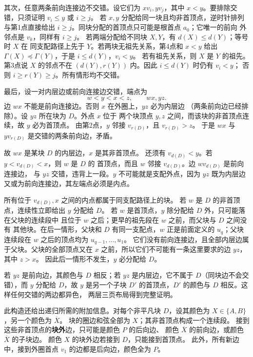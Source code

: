 \begin{solution}
其次，任意两条前向连接边不交错。设它们为 $xv_i,yv_j$，其中
$x<y$。要排除交错，只须证明 $v_i\leq y$ 或 $i\geq j$。
若 $x,y$ 分配给同一块且均非首顶点，逆时针排列与第1点直接给出
$i\geq j$。同块分配的首顶点只可能是根首点 $a_0$；它唯一的前向
外邻点是 $v_k$，同样有 $i\geq j$。
若两端分配给不同块 $X,Y$，有 $d(X)\leq d(Y)$；等号时 $X$ 在
同支配路径上先于 $Y$。若两块无祖先关系，第4点和 $x<y$ 给出
$\Gamma(X)\preceq\Gamma(Y)$，于是 $i\leq d(Y)$，$v_i<y$。
若有祖先关系，则 $X$ 是 $Y$ 的祖先。第3点说 $X$ 的邻点不在
$(d(Y),r(Y))$ 内。因此 $i\leq d(Y)$ 时仍有 $v_i<y$；
否则 $i\geq r(Y)\geq j$。所有情形均不交错。

最后，设一对内层边或前向连接边交错，端点为
\[
 w<y<x<z,\qquad wx, yz.
\]
边 $wx$ 不能是前向连接边。否则 $x$ 在外圈上，$yz$ 必为内层边
（两条前向边已经排除）。设 $yz$ 所在块为 $D$。外点 $x$ 位于
两个块顶点 $y,z$ 之间，而该块的非首顶点连续，故 $y$ 必为首顶点。
由第2点，$y$ 邻接 $v_{r(D)}$，且 $v_{r(D)}>z$。
于是 $wx$ 与 $yv_{r(D)}$ 是交错的两条前向边，矛盾。

故 $wx$ 是某块 $D$ 的内层边，$x$ 是其非首顶点。
还须有 $v_{d(D)}<y$。若 $y<v_{d(D)}<x$，则 $w$ 是 $D$ 的
首顶点，而且 $w$ 邻接 $v_{d(D)}$。边 $wv_{d(D)}$ 是前向连接边，
与 $yz$ 交错，违背上一段。$y$ 不可能就是支配外点，因为 $yz$
既为内层边又或为前向连接边，其左端点必须是内点。

所有位于 $v_{d(D)},x$ 之间的内点都属于同支配路径上的块。
若 $w$ 是 $D$ 的非首顶点，连续性立即给出 $y$ 分配给 $D$。
若 $w$ 是首顶点，$y$ 除分配给 $D$ 外，只可能落在父块的连续段中
且位于 $w$ 之后；更早的祖先段在 $w$ 之前，而父块与 $D$ 之间没有
其他块。在后一情形，父块和 $D$ 有同一支配点，$w$ 正是前面定义的
$u_q$；父块连续段在 $w$ 之后的顶点均为 $u_{q-1},\ldots,u_1$。
它们没有前向连接边，且全部内层边属于父块。父块的全部顶点又在
$x$ 之前，所以它们不可能有一条这里要求的边 $yz$，其中 $z>x$。
因此后一情形不发生，$y$ 必分配给 $D$。

若 $yz$ 是前向边，其颜色与 $D$ 相反；若 $yz$ 是内层边，它不属于
$D$（同块边不会交错），而 $y$ 分配给 $D$，故 $y$ 是另一个子块
$D'$ 的首顶点，$D'$ 的颜色与 $D$ 相反。这样任何交错的两边都异色，
两层三页布局得到完整证明。

此构造还给出递归所需的附加信息。对每个非平凡块 $D$，设其颜色为
$X\in\{A,B\}$，另一个颜色为 $\overline X$。
块的圈边和弦全部为 $X$；其非首顶点构成一个连续段。
接到这些非首顶点的\textbf{块外}边，只可能是颜色 $P$ 的后向边、
颜色 $\overline X$ 的前向边，或颜色 $\overline X$ 的子块边。
颜色 $X$ 的块外边若接到 $D$，只能接到首顶点。
此外，所有新边中，接到外圈首点 $v_1$ 的边都是后向边，颜色全为 $P$。


\end{solution}
